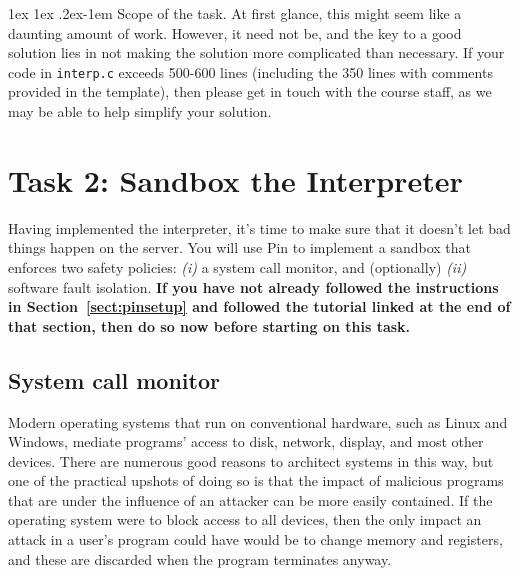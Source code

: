 \documentclass[11pt]{article}
\makeatletter
\renewcommand{\paragraph}{%
  \@startsection{paragraph}{4}%
  {\z@}{1ex \@plus 1ex \@minus .2ex}{-1em}%
  {\normalfont\normalsize\bfseries}
}
\makeatother
\begin{document}
\paragraph{Scope of the task.} At first glance, this might seem like a daunting amount of work. However, it need not be, and the key to a good solution lies in not making the solution more complicated than necessary. If your code in \verb'interp.c' exceeds 500-600 lines (including the 350 lines with comments provided in the template), then please get in touch with the course staff, as we may be able to help simplify your solution.

\newpage
\section{Task 2: Sandbox the Interpreter}

Having implemented the interpreter, it's time to make sure that it doesn't let bad things happen on the server. You will use Pin to implement a sandbox that enforces two safety policies: \emph{(i)} a system call monitor, and (optionally) \emph{(ii)} software fault isolation. \textbf{If you have not already followed the instructions in Section~\ref{sect:pinsetup} and followed the tutorial linked at the end of that section, then do so now before starting on this task.}

\subsection{System call monitor}
Modern operating systems that run on conventional hardware, such as Linux and Windows, mediate programs' access to disk, network, display, and most other devices. There are numerous good reasons to architect systems in this way, but one of the practical upshots of doing so is that the impact of malicious programs that are under the influence of an attacker can be more easily contained. If the operating system were to block access to all devices, then the only impact an attack in a user's program could have would be to change memory and registers, and these are discarded when the program terminates anyway.
\end{document}
